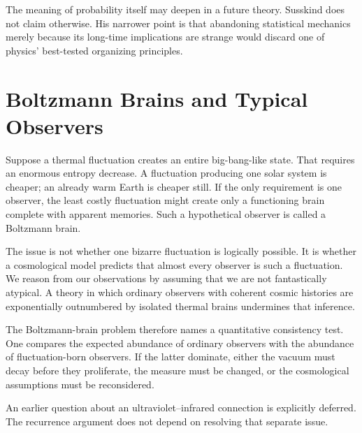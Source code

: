 \begin{classroomqa}
\end{classroomqa}

The meaning of probability itself may deepen in a future theory. Susskind does not claim otherwise. His narrower point is that abandoning statistical mechanics merely because its long-time implications are strange would discard one of physics' best-tested organizing principles.

\section{Boltzmann Brains and Typical Observers}

Suppose a thermal fluctuation creates an entire big-bang-like state. That requires an enormous entropy decrease. A fluctuation producing one solar system is cheaper; an already warm Earth is cheaper still. If the only requirement is one observer, the least costly fluctuation might create only a functioning brain complete with apparent memories. Such a hypothetical observer is called a Boltzmann brain.

The issue is not whether one bizarre fluctuation is logically possible. It is whether a cosmological model predicts that almost every observer is such a fluctuation. We reason from our observations by assuming that we are not fantastically atypical. A theory in which ordinary observers with coherent cosmic histories are exponentially outnumbered by isolated thermal brains undermines that inference.

The Boltzmann-brain problem therefore names a quantitative consistency test. One compares the expected abundance of ordinary observers with the abundance of fluctuation-born observers. If the latter dominate, either the vacuum must decay before they proliferate, the measure must be changed, or the cosmological assumptions must be reconsidered.

An earlier question about an ultraviolet--infrared connection is explicitly deferred. The recurrence argument does not depend on resolving that separate issue.

